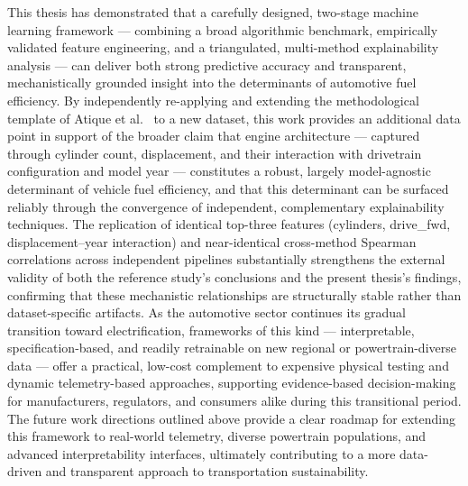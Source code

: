 This thesis has demonstrated that a carefully designed, two-stage machine learning framework --- combining a broad algorithmic benchmark, empirically validated feature engineering, and a triangulated, multi-method explainability analysis --- can deliver both strong predictive accuracy and transparent, mechanistically grounded insight into the determinants of automotive fuel efficiency. By independently re-applying and extending the methodological template of Atique et al.~\cite{atique2026explainable} to a new dataset, this work provides an additional data point in support of the broader claim that engine architecture --- captured through cylinder count, displacement, and their interaction with drivetrain configuration and model year --- constitutes a robust, largely model-agnostic determinant of vehicle fuel efficiency, and that this determinant can be surfaced reliably through the convergence of independent, complementary explainability techniques. The replication of identical top-three features (cylinders, drive\_fwd, displacement--year interaction) and near-identical cross-method Spearman correlations across independent pipelines substantially strengthens the external validity of both the reference study's conclusions and the present thesis's findings, confirming that these mechanistic relationships are structurally stable rather than dataset-specific artifacts. As the automotive sector continues its gradual transition toward electrification, frameworks of this kind --- interpretable, specification-based, and readily retrainable on new regional or powertrain-diverse data --- offer a practical, low-cost complement to expensive physical testing and dynamic telemetry-based approaches, supporting evidence-based decision-making for manufacturers, regulators, and consumers alike during this transitional period. The future work directions outlined above provide a clear roadmap for extending this framework to real-world telemetry, diverse powertrain populations, and advanced interpretability interfaces, ultimately contributing to a more data-driven and transparent approach to transportation sustainability.